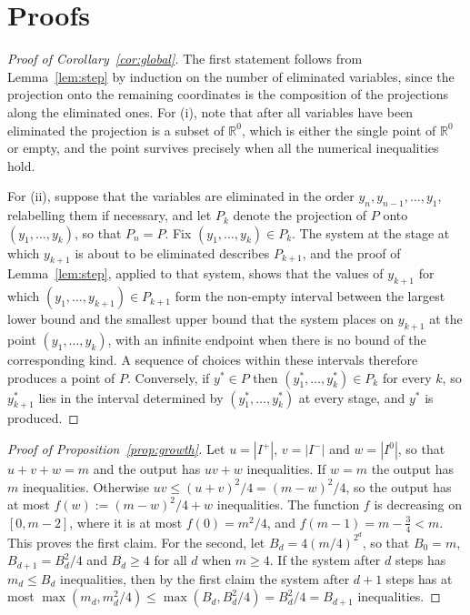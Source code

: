 \documentclass[11pt]{article}
\theoremstyle{definition}
\newcommand{\Ipos}{I^{+}}
\newcommand{\Ineg}{I^{-}}
\newcommand{\Izero}{I^{0}}
\begin{document}
\appendix

\section{Proofs}
\label{app:proofs}

\begin{proof}[Proof of Corollary~\ref{cor:global}]
The first statement follows from Lemma~\ref{lem:step} by induction on the number of eliminated variables, since the projection onto the remaining coordinates is the composition of the projections along the eliminated ones. For (i), note that after all variables have been eliminated the projection is a subset of $\mathbb{R}^0$, which is either the single point of $\mathbb{R}^0$ or empty, and the point survives precisely when all the numerical inequalities hold.

For (ii), suppose that the variables are eliminated in the order $y_n,y_{n-1},\dots,y_1$, relabelling them if necessary, and let $P_k$ denote the projection of $P$ onto $(y_1,\dots,y_k)$, so that $P_n=P$. Fix $(y_1,\dots,y_k)\in P_k$. The system at the stage at which $y_{k+1}$ is about to be eliminated describes $P_{k+1}$, and the proof of Lemma~\ref{lem:step}, applied to that system, shows that the values of $y_{k+1}$ for which $(y_1,\dots,y_{k+1})\in P_{k+1}$ form the non-empty interval between the largest lower bound and the smallest upper bound that the system places on $y_{k+1}$ at the point $(y_1,\dots,y_k)$, with an infinite endpoint when there is no bound of the corresponding kind. A sequence of choices within these intervals therefore produces a point of $P$. Conversely, if $y^{*}\in P$ then $(y^{*}_1,\dots,y^{*}_k)\in P_k$ for every $k$, so $y^{*}_{k+1}$ lies in the interval determined by $(y^{*}_1,\dots,y^{*}_k)$ at every stage, and $y^{*}$ is produced.
\end{proof}

\begin{proof}[Proof of Proposition~\ref{prop:growth}]
Let $u=|\Ipos|$, $v=|\Ineg|$ and $w=|\Izero|$, so that $u+v+w=m$ and the output has $uv+w$ inequalities. If $w=m$ the output has $m$ inequalities. Otherwise $uv\le (u+v)^2/4=(m-w)^2/4$, so the output has at most $f(w):=(m-w)^2/4+w$ inequalities. The function $f$ is decreasing on $[0,m-2]$, where it is at most $f(0)=m^2/4$, and $f(m-1)=m-\tfrac34<m$. This proves the first claim. For the second, let $B_d=4(m/4)^{2^d}$, so that $B_0=m$, $B_{d+1}=B_d^2/4$ and $B_d\ge 4$ for all $d$ when $m\ge 4$. If the system after $d$ steps has $m_d\le B_d$ inequalities, then by the first claim the system after $d+1$ steps has at most $\max(m_d,m_d^2/4)\le\max(B_d,B_d^2/4)=B_d^2/4=B_{d+1}$ inequalities.
\end{proof}
\end{document}

